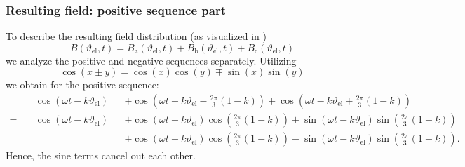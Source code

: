 \begin{frame}
	\frametitle{Resulting field: positive sequence part}
    To describe the resulting field distribution (as visualized in ) 
    \begin{equation}
        B(\vartheta_\mathrm{el}, t) = B_\mathrm{a}(\vartheta_\mathrm{el}, t) + B_\mathrm{b}(\vartheta_\mathrm{el}, t) + B_\mathrm{c}(\vartheta_\mathrm{el}, t)
    \end{equation}
    we analyze the positive and negative sequences separately. Utilizing $$\cos(x \pm y) = \cos(x)\cos(y) \mp \sin(x)\sin(y)$$ we obtain for the positive sequence:
    \begin{equation*}
        \begin{alignedat}{2}
        &\cos(\omega t - k \vartheta_\mathrm{el}) &&+ \cos(\omega t - k \vartheta_\mathrm{el} - \frac{2\pi}{3}(1-k)) + \cos(\omega t - k \vartheta_\mathrm{el} + \frac{2\pi}{3}(1-k))\\
         = \quad &\cos(\omega t - k \vartheta_\mathrm{el}) &&+ \cos(\omega t - k \vartheta_\mathrm{el}) \cos(\frac{2\pi}{3}(1-k)) + \sin(\omega t - k \vartheta_\mathrm{el}) \sin(\frac{2\pi}{3}(1-k))\\
         & &&+ \cos(\omega t - k \vartheta_\mathrm{el}) \cos(\frac{2\pi}{3}(1-k)) - \sin(\omega t - k \vartheta_\mathrm{el})\sin(\frac{2\pi}{3}(1-k)).   
        \end{alignedat}
    \end{equation*}
    Hence, the sine terms cancel out each other.
\end{frame}


